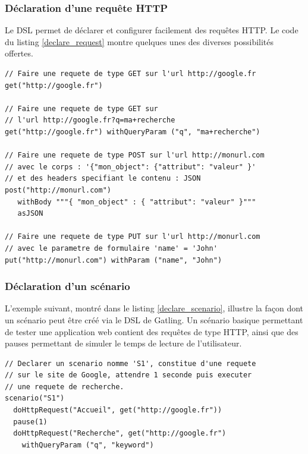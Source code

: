 \subsubsection{Déclaration d'une requête HTTP}

Le DSL permet de déclarer et configurer facilement des requêtes HTTP. Le code du listing \ref{declare_request} montre quelques unes des diverses possibilités offertes. 

\begin{lstlisting}[caption={Déclaration d'une requête HTTP},label={declare_request}]
// Faire une requete de type GET sur l'url http://google.fr
get("http://google.fr")

// Faire une requete de type GET sur 
// l'url http://google.fr?q=ma+recherche
get("http://google.fr") withQueryParam ("q", "ma+recherche")

// Faire une requete de type POST sur l'url http://monurl.com
// avec le corps : '{"mon_object": {"attribut": "valeur" }'
// et des headers specifiant le contenu : JSON
post("http://monurl.com")
   withBody """{ "mon_object" : { "attribut": "valeur" }"""
   asJSON

// Faire une requete de type PUT sur l'url http://monurl.com
// avec le parametre de formulaire 'name' = 'John'
put("http://monurl.com") withParam ("name", "John")
\end{lstlisting}

\subsubsection{Déclaration d'un scénario}

L'exemple suivant, montré dans le listing \ref{declare_scenario}, illustre la façon dont un scénario peut être créé via le DSL de Gatling. Un scénario basique permettant de tester une application web contient des requêtes de type HTTP, ainsi que des pauses permettant de simuler le temps de lecture de l'utilisateur.

\begin{lstlisting}[caption={Déclaration d'un scénario simple},label={declare_scenario}]
// Declarer un scenario nomme 'S1', constitue d'une requete 
// sur le site de Google, attendre 1 seconde puis executer 
// une requete de recherche.
scenario("S1")
  doHttpRequest("Accueil", get("http://google.fr"))
  pause(1)
  doHttpRequest("Recherche", get("http://google.fr") 
    withQueryParam ("q", "keyword")
\end{lstlisting}

